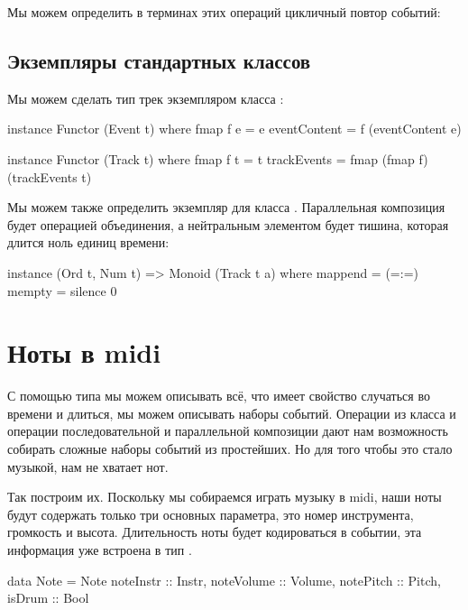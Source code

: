 Мы можем определить в терминах этих операций цикличный повтор
событий:


\subsection{Экземпляры стандартных классов}

Мы можем сделать тип трек экземпляром класса :

\begin{code}
instance Functor (Event t) where
    fmap f e = e{ eventContent = f (eventContent e) }

instance Functor (Track t) where
    fmap f t = t{ trackEvents = fmap (fmap f) (trackEvents t) }
\end{code}

Мы можем также определить экземпляр для класса . Параллельная
композиция будет операцией объединения, а нейтральным элементом
будет тишина, которая длится ноль единиц времени:

\begin{code}
instance (Ord t, Num t) => Monoid (Track t a) where
    mappend = (=:=)
    mempty  = silence 0
\end{code}

\section{Ноты в midi}

С помощью типа  мы можем описывать всё, что 
имеет свойство случаться во времени и длиться, мы можем
описывать наборы событий. Операции из класса 
и операции последовательной и параллельной композиции
дают нам возможность собирать сложные наборы событий
из простейших. Но для того чтобы это стало музыкой, 
нам не хватает нот.  

Так построим их. Поскольку мы собираемся играть музыку
в midi, наши ноты будут содержать только три основных параметра,
это номер инструмента, громкость и высота. Длительность
ноты будет кодироваться в событии, эта информация уже встроена
в тип .

\begin{code}
data Note = Note {
    noteInstr   :: Instr,
    noteVolume  :: Volume,
    notePitch   :: Pitch,
    isDrum      :: Bool  }
\end{code}

